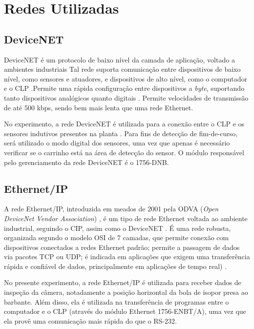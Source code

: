 \section{Redes Utilizadas}
\subsection{DeviceNET}
DeviceNET é um protocolo de baixo nível da camada de aplicação, voltado a ambientes industriais \cite{dnetrta} Tal rede suporta comunicação entre dispositivos de baixo nível, como sensores e atuadores, e dispositivos de alto nível, como o computador e o CLP \cite{devicenetrockwell}.Permite uma rápida configuração entre dispositivos a \textit{byte}, suportando tanto dispositivos analógicos quanto digitais \cite{redytton}. Permite velocidades de transmissão de até 500 kbps, sendo bem mais lenta que uma rede Ethernet.

No experimento, a rede DeviceNET é utilizada para a conexão entre o CLP e os sensores indutivos presentes na planta \cite{redytton}.  Para fins de detecção de fim-de-curso, será utilizado o modo digital dos sensores, uma vez que apenas é necessário verificar se o carrinho está na área de detecção do sensor. O módulo responsável pelo gerenciamento da rede DeviceNET é o 1756-DNB.

\subsection{Ethernet/IP}
A rede Ethernet/IP, introduzida em meados de 2001 pela ODVA (\textit{Open DeviceNet Vendor Association}) \cite{eipodva1}, é um tipo de rede Ethernet voltada ao ambiente industrial, seguindo o CIP, assim como o DeviceNET \cite{eiprta}. É uma rede robusta, organizada segundo o modelo OSI de 7 camadas, que permite conexão com dispositivos conectados a redes Ethernet padrão; permite a passagem de dados via pacotes TCP ou UDP; é indicada em aplicações que exigem uma transferência rápida e confiável de dados, principalmente em aplicações de tempo real) \cite{eiprockwell}.

No presente experimento, a rede Ethernet/IP é utilizada para receber dados de inspeção da câmera, notadamente a posição horizontal da bola de isopor presa ao barbante. Além disso, ela é utilizada na transferência de programas entre o computador e o CLP (através do módulo Ethernet 1756-ENBT/A), uma vez que ela provê uma comunicação mais rápida do que o RS-232.

